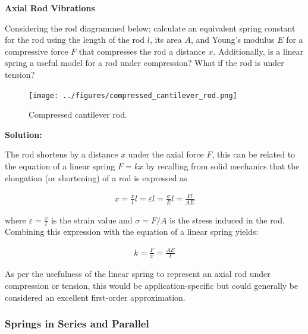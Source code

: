 \documentclass[12pt,letter]{article}
\begin{document}
			\begin{example}
    			
    		\textbf{Axial Rod Vibrations}

			\noindent	Considering the rod diagrammed below; calculate an equivalent spring constant for the rod using the length of the rod $l$, its area $A$, and Young's modulus $E$ for a compressive force $F$ that compresses the rod a distance $x$. Additionally, is a linear spring a useful model for a rod under compression? What if the rod is under tension?
        
		 		\begin{figure}[H]
		 			\centering
		 			\texttt{[image: ../figures/compressed\_cantilever\_rod.png]}
		 			\caption{Compressed cantilever rod. }
		 		\end{figure}	   
       
			    \noindent \textbf{Solution:}

				 The rod shortens by a distance $x$ under the axial force $F$, this can be related to the equation of a linear spring $F=kx$ by recalling from solid mechanics that the elongation (or shortening) of a rod is expressed as 
			
			    \begin{eqnarray}
			    x=\frac{x}{l}l=\varepsilon l = \frac{\sigma}{E}l = \frac{Fl}{AE}
			    \end{eqnarray}    
			    
			    where  $\varepsilon = \frac{x}{l}$ is the strain value and $\sigma = F/A$ is the stress induced in the rod. Combining this expression with the equation of a linear spring yields:
			    
			    \begin{eqnarray}
			    k = \frac{F}{x}= \frac{AE}{l}
			    \end{eqnarray}     
			   
			    As per the usefulness of the linear spring to represent an axial rod under compression or tension, this would be application-specific but could generally be considered an excellent first-order approximation.  
			
			\end{example}

		\subsubsection{Springs in Series and Parallel}
			
\end{document}
